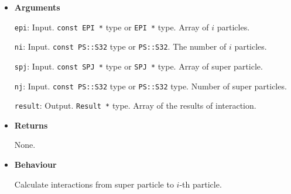 \begin{itemize}

\item {\bf Arguments}

  \texttt{epi}: Input. \texttt{const EPI *} type or \texttt{EPI *} type. Array of $i$ particles.

  \texttt{ni}: Input. \texttt{const PS::S32} type or \texttt{PS::S32}. The number of $i$ particles.

  \texttt{spj}: Input. \texttt{const SPJ *} type or \texttt{SPJ *} type. Array of super particle.

  \texttt{nj}: Input. \texttt{const PS::S32} type or \texttt{PS::S32} type. Number of super particles.

  \texttt{result}: Output. \texttt{Result *} type. Array of the results of interaction.

\item {\bf Returns}

  None.
  
\item {\bf Behaviour}

  Calculate interactions from super particle to $i$-th particle.

\end{itemize}
